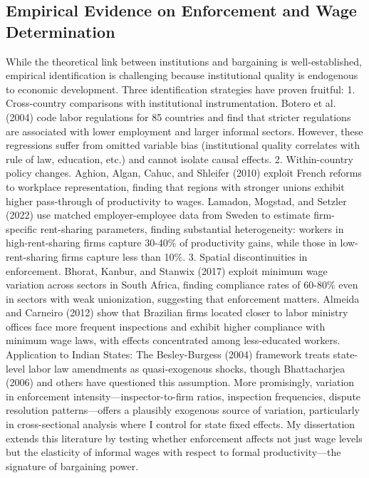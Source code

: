 \subsection{Empirical Evidence on Enforcement and Wage Determination}
While the theoretical link between institutions and bargaining is well-established, empirical identification is challenging because institutional quality is endogenous to economic development. Three identification strategies have proven fruitful:
1. Cross-country comparisons with institutional instrumentation. Botero et al. (2004) code labor regulations for 85 countries and find that stricter regulations are associated with lower employment and larger informal sectors. However, these regressions suffer from omitted variable bias (institutional quality correlates with rule of law, education, etc.) and cannot isolate causal effects.
2. Within-country policy changes. Aghion, Algan, Cahuc, and Shleifer (2010) exploit French reforms to workplace representation, finding that regions with stronger unions exhibit higher pass-through of productivity to wages. Lamadon, Mogstad, and Setzler (2022) use matched employer-employee data from Sweden to estimate firm-specific rent-sharing parameters, finding substantial heterogeneity: workers in high-rent-sharing firms capture 30-40\% of productivity gains, while those in low-rent-sharing firms capture less than 10\%.
3. Spatial discontinuities in enforcement. Bhorat, Kanbur, and Stanwix (2017) exploit minimum wage variation across sectors in South Africa, finding compliance rates of 60-80\% even in sectors with weak unionization, suggesting that enforcement matters. Almeida and Carneiro (2012) show that Brazilian firms located closer to labor ministry offices face more frequent inspections and exhibit higher compliance with minimum wage laws, with effects concentrated among less-educated workers.
Application to Indian States: The Besley-Burgess (2004) framework treats state-level labor law amendments as quasi-exogenous shocks, though Bhattacharjea (2006) and others have questioned this assumption. More promisingly, variation in enforcement intensity—inspector-to-firm ratios, inspection frequencies, dispute resolution patterns—offers a plausibly exogenous source of variation, particularly in cross-sectional analysis where I control for state fixed effects. My dissertation extends this literature by testing whether enforcement affects not just wage levels but the elasticity of informal wages with respect to formal productivity—the signature of bargaining power.

